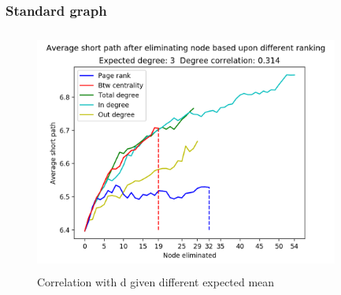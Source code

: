 \documentclass[10pt,english]{article}\usepackage{graphicx, color}
\numberwithin{equation}{section}
\numberwithin{figure}{section}
\begin{document}
\subsubsection{Standard graph}
\begin{figure}[htbp]
\centering\includegraphics[width=10cm, height=8cm]{avgpath}
\caption{Correlation with d given different expected mean}
\end{figure}
\quad\\
\end{document}
